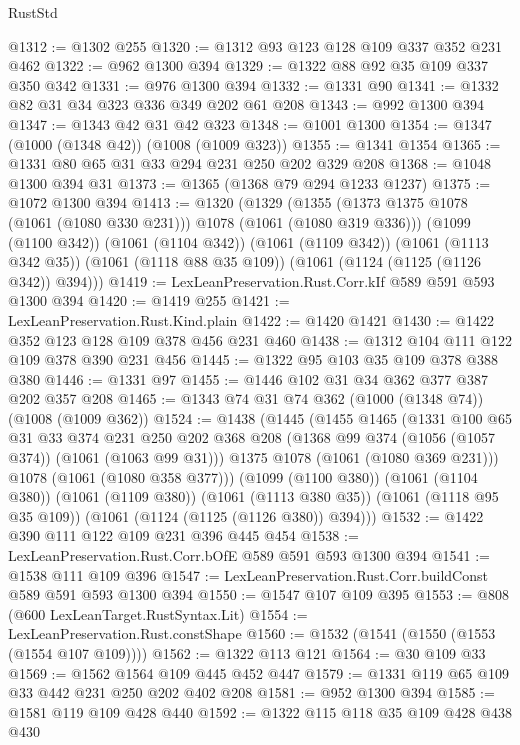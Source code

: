 \begin{lexlean}{RustStd}
\begin{coremodule}
@1312 := @1302 @255
@1320 := @1312 @93 @123 @128 @109 @337 @352 @231 @462
@1322 := @962 @1300 @394
@1329 := @1322 @88 @92 @35 @109 @337 @350 @342
@1331 := @976 @1300 @394
@1332 := @1331 @90
@1341 := @1332 @82 @31 @34 @323 @336 @349 @202 @61 @208
@1343 := @992 @1300 @394
@1347 := @1343 @42 @31 @42 @323
@1348 := @1001 @1300
@1354 := @1347 (@1000 (@1348 @42)) (@1008 (@1009 @323))
@1355 := @1341 @1354
@1365 := @1331 @80 @65 @31 @33 @294 @231 @250 @202 @329 @208
@1368 := @1048 @1300 @394 @31
@1373 := @1365 (@1368 @79 @294 @1233 @1237)
@1375 := @1072 @1300 @394
@1413 := @1320
    (@1329
      (@1355 (@1373 @1375 @1078 (@1061 (@1080 @330 @231))) @1078 (@1061 (@1080 @319 @336)))
      (@1099 (@1100 @342))
      (@1061 (@1104 @342))
      (@1061 (@1109 @342))
      (@1061 (@1113 @342 @35))
      (@1061 (@1118 @88 @35 @109))
      (@1061 (@1124 (@1125 (@1126 @342)) @394)))
@1419 := LexLeanPreservation.Rust.Corr.kIf @589 @591 @593 @1300 @394
@1420 := @1419 @255
@1421 := LexLeanPreservation.Rust.Kind.plain
@1422 := @1420 @1421
@1430 := @1422 @352 @123 @128 @109 @378 @456 @231 @460
@1438 := @1312 @104 @111 @122 @109 @378 @390 @231 @456
@1445 := @1322 @95 @103 @35 @109 @378 @388 @380
@1446 := @1331 @97
@1455 := @1446 @102 @31 @34 @362 @377 @387 @202 @357 @208
@1465 := @1343 @74 @31 @74 @362 (@1000 (@1348 @74)) (@1008 (@1009 @362))
@1524 := @1438
    (@1445
      (@1455
        @1465
        (@1331
          @100
          @65
          @31
          @33
          @374
          @231
          @250
          @202
          @368
          @208
          (@1368 @99 @374 (@1056 (@1057 @374)) (@1061 (@1063 @99 @31)))
          @1375
          @1078
          (@1061 (@1080 @369 @231)))
        @1078
        (@1061 (@1080 @358 @377)))
      (@1099 (@1100 @380))
      (@1061 (@1104 @380))
      (@1061 (@1109 @380))
      (@1061 (@1113 @380 @35))
      (@1061 (@1118 @95 @35 @109))
      (@1061 (@1124 (@1125 (@1126 @380)) @394)))
@1532 := @1422 @390 @111 @122 @109 @231 @396 @445 @454
@1538 := LexLeanPreservation.Rust.Corr.bOfE @589 @591 @593 @1300 @394
@1541 := @1538 @111 @109 @396
@1547 := LexLeanPreservation.Rust.Corr.buildConst @589 @591 @593 @1300 @394
@1550 := @1547 @107 @109 @395
@1553 := @808 (@600 LexLeanTarget.RustSyntax.Lit)
@1554 := LexLeanPreservation.Rust.constShape
@1560 := @1532 (@1541 (@1550 (@1553 (@1554 @107 @109))))
@1562 := @1322 @113 @121
@1564 := @30 @109 @33
@1569 := @1562 @1564 @109 @445 @452 @447
@1579 := @1331 @119 @65 @109 @33 @442 @231 @250 @202 @402 @208
@1581 := @952 @1300 @394
@1585 := @1581 @119 @109 @428 @440
@1592 := @1322 @115 @118 @35 @109 @428 @438 @430

\end{coremodule}
\end{lexlean}
